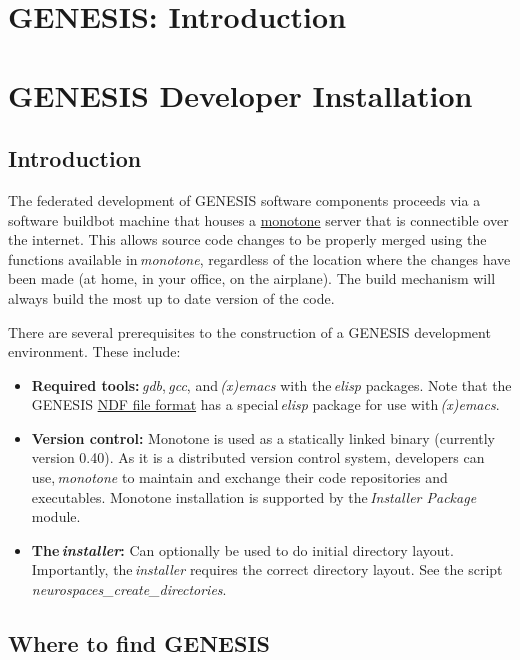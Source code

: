 \documentclass[12pt]{article}
\begin{document}
\section*{GENESIS: Introduction}

\section*{GENESIS Developer Installation}

\subsection*{Introduction}

The federated development of GENESIS software components proceeds via a software buildbot machine that houses a \href{http://monotone.ca/}{monotone} server that is connectible over the internet. This allows source code changes to be properly merged using the functions available in\,{\it monotone}, regardless of the location where the changes have been made (at home, in your office, on the airplane). The build mechanism will always build the most up to date version of the code.

There are several prerequisites to the construction of a GENESIS development environment. These include:

\begin{itemize}

\item {\bf Required tools:}\,{\it gdb},\,{\it gcc}, and\,{\it (x)emacs} with the\,{\it elisp} packages. Note that the GENESIS \href{../ndf-file-format/ndf-file-format.pdf}{NDF file format} has a special\,{\it elisp} package for use with\,{\it (x)emacs}.
\item {\bf Version control:} Monotone is used as a statically linked binary (currently version 0.40). As it is a distributed version control system, developers can use,\,{\it monotone} to maintain and exchange their code repositories and executables. Monotone installation is supported by the\,{\it Installer Package} module. 
\item {\bf  The\,{\it installer}:} Can optionally be used to do initial directory layout. Importantly, the\,{\it installer} requires the correct directory layout. See the script {\it neurospaces\_create\_directories}.

\end{itemize}

\subsection*{Where to find GENESIS}
\end{document}
